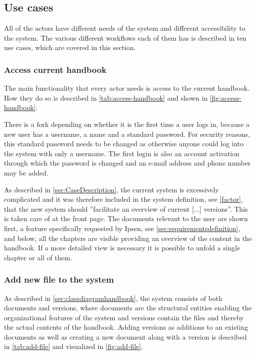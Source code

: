 \subsection{Use cases} \label{sec:usecases}
All of the actors have different needs of the system and different accessibility to the system.
The various different workflows each of them has is described in ten use cases, which are covered in this section.

\subsubsection{Access current handbook}
The main functionality that every actor needs is access to the current handbook.
How they do so is described in \cref{tab:access-handbook} and shown in \cref{fig:access-handbook}.




There is a fork depending on whether it is the first time a user logs in, because a new user has a username, a name and a standard password.
For security reasons, this standard password needs to be changed as otherwise anyone could log into the system with only a username.
The first login is also an account activation through which the password is changed and an e-mail address and phone number may be added.

As described in \cref{sec:CaseDescription}, the current system is excessively complicated and it was therefore included in the system definition, see \cref{factor}, that the new system should ''facilitate an overview of current [...] versions''.
This is taken care of at the front page.
The documents relevant to the user are shown first, a feature specifically requested by Ipsen, see \cref{sec:requirementsdefinition}, and below, all the chapters are visible providing an overview of the content in the handbook.
If a more detailed view is necessary it is possible to unfold a single chapter or all of them.


\subsubsection{Add new file to the system}
As described in \cref{sec:classdiagramhandbook}, the system consists of both documents and versions, where documents are the structural entities enabling the organizational features of the system and versions contain the files and thereby the actual contents of the handbook.
Adding versions as additions to an existing documents as well as creating a new document along with a version is described in \cref{tab:add-file} and visualized in \cref{fig:add-file}.

